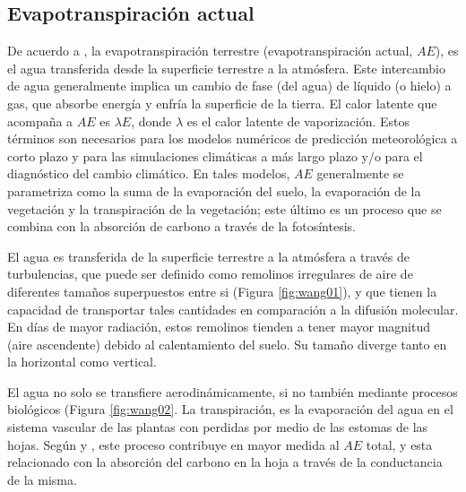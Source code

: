 \documentclass[12pt]{article}
\begin{document}
\subsection{Evapotranspiración actual}

De acuerdo a \citet{wang2012review}, la evapotranspiración terrestre (evapotranspiración actual, $AE$), es el agua transferida desde la superficie terrestre a la atmósfera. Este intercambio de agua generalmente implica un cambio de fase (del agua) de líquido (o hielo) a gas, que absorbe energía y enfría la superficie de la tierra. El calor latente que acompaña a $AE$ es $\lambda E$, donde $\lambda$ es el calor latente de vaporización. Estos términos son necesarios para los modelos numéricos de predicción meteorológica a corto plazo y para las simulaciones climáticas a más largo plazo y/o para el diagnóstico del cambio climático. En tales modelos, $AE$ generalmente se parametriza como la suma de la evaporación del suelo, la evaporación de la vegetación y la transpiración de la vegetación; este último es un proceso que se combina con la absorción de carbono a través de la fotosíntesis.

\vspace*{.5cm}


\clearpage
El agua es transferida de la superficie terrestre a la atmósfera a través de turbulencias, que puede ser definido como remolinos irregulares de aire de diferentes tamaños superpuestos entre si (Figura \ref{fig:wang01}), y que tienen la capacidad de transportar tales cantidades en comparación a la difusión molecular. En días de mayor radiación, estos remolinos tienden a tener mayor magnitud (aire ascendente) debido al calentamiento del suelo. Su tamaño diverge tanto en la horizontal como vertical. 

El agua no solo se transfiere aerodinámicamente, si no también mediante procesos biológicos (Figura \ref{fig:wang02}. La transpiración, es la evaporación del agua en el sistema vascular de las plantas con perdidas por medio de las estomas de las hojas. Según \citet{dirmeyer2006gswp} y \citet{lawrence2007partitioning}, este proceso contribuye en mayor medida al $AE$ total, y esta relacionado con la absorción del carbono en la hoja a través de la conductancia de la misma.


\end{document}
